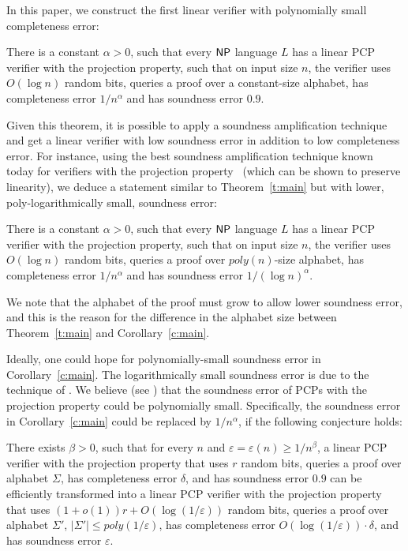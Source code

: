 In this paper, we construct the first linear verifier with
polynomially small completeness error:
\begin{theorem}\label{t:main}
There is a constant $\alpha >0$, such that every ${\sf {\sf NP}}$ language
$L$ has a linear PCP verifier with the projection property, such that
on input size $n$, the verifier uses $O(\log n)$ random bits, queries
a proof over a constant-size alphabet, has completeness error
$1/n^{\alpha}$ and has soundness error $0.9$.
\end{theorem}
Given this theorem, it is possible to apply a soundness amplification
technique and get a linear verifier with low soundness error in
addition to low completeness error.
For instance,
using the best soundness amplification technique
known today for verifiers with the projection property~\cite{MR08}
(which can be shown to preserve linearity), we deduce a statement
similar to Theorem~\ref{t:main} but with lower, poly-logarithmically
small, soundness error:
\begin{corollary}\label{c:main}
There is a constant $\alpha >0$, such that every ${\sf {\sf NP}}$ language
$L$ has a linear PCP verifier with the projection property, such that
on input size $n$, the verifier uses $O(\log n)$ random bits, queries
a proof over $poly(n)$-size alphabet, has completeness error
$1/n^{\alpha}$ and has soundness error $1/(\log n)^{\alpha}$.
\end{corollary}
We note that the alphabet of the proof must grow to
allow lower soundness error, and this is the reason for the difference
in the alphabet size between Theorem~\ref{t:main} and
Corollary~\ref{c:main}.

Ideally, one could hope for polynomially-small soundness error in Corollary~\ref{c:main}. The
logarithmically small soundness error is due to the technique of
\cite{MR08}. We believe (see \cite{M-proj}) that the soundness error of PCPs with the projection property could be polynomially small.
Specifically, the soundness error in Corollary~\ref{c:main} could be replaced by $1/n^{\alpha}$, if the following conjecture holds:

\begin{conjecture}\label{c:soundness}
There exists $\beta>0$, such that for every $n$ and $\varepsilon = \varepsilon(n)\geq 1/n^{\beta}$,
a linear PCP verifier with the projection property that uses $r$ random bits, queries a proof over alphabet $\Sigma$, has completeness error $\delta$, and has soundness error $0.9$ can be efficiently transformed into a linear PCP verifier with the projection property that uses $(1+o(1))r+O(\log (1/\varepsilon))$ random bits, queries a proof over alphabet $\Sigma'$, $|\Sigma'|\leq poly(1/\varepsilon)$, has completeness error $O(\log(1/\varepsilon))\cdot\delta$, and has soundness error $\varepsilon$. 
\end{conjecture} 

